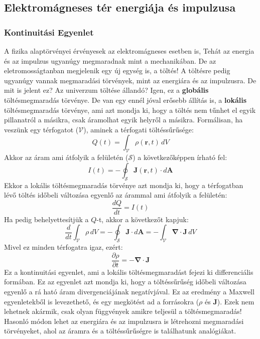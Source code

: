 \documentclass[../main.tex]{subfiles}
\begin{document}
\subsection{Elektromágneses tér energiája és impulzusa}
\subsubsection{Kontinuitási Egyenlet}
A fizika alaptörvényei érvényesek az elektromágneses esetben is, Tehát az energia és az impulzus ugyanúgy megmaradnak mint a mechanikában. De az eletromosságtanban megjelenik egy új egység is,
a töltés! A töltésre pedig ugyanúgy vannak megmaradási törvények, mint az energiára és az impulzusra. De mit is jelent ez? Az univerzum töltése állandó? Igen, ez a \textbf{globális} töltésmegmaradás törvénye.
De van egy ennél jóval erősebb állítás is, a \textbf{lokális} töltésmegmaradás törvénye, ami azt mondja ki, hogy a töltés nem tűnhet el egyik pillanatról a másikra, csak áramolhat egyik helyről a másikra.
Formálisan, ha veszünk egy térfogatot ($\mathcal{V}$), aminek a térfogati töltéssűrűsége:
\begin{equation}
    Q(t) = \int_{\mathcal{V}} \rho(\mathbf{r}, t) \, dV
\end{equation}
Akkor az áram ami átfolyik a felületén ($\mathcal{S}$) a következőképpen írható fel:
\begin{equation}
    I(t) = - \oint_{\mathcal{S}} \mathbf{J}(\mathbf{r}, t) \cdot d\mathbf{A}
\end{equation}
Ekkor a lokális töltésmegmaradás törvénye azt mondja ki, hogy a térfogatban lévő töltés időbeli változása egyenlő az árammal ami átfolyik a felületén:
\begin{equation}
    \frac{dQ}{dt} = I(t)
\end{equation}
Ha pedig behelyettesítjük a $Q$-t, akkor a következőt kapjuk:
\begin{equation}
    \frac{d}{dt} \int_{\mathcal{V}} \rho \, dV = - \oint_{\mathcal{S}} \mathbf{J} \cdot d\mathbf{A} = - \int_{\mathcal{V}} \boldsymbol{\nabla} \cdot \mathbf{J} \, dV
\end{equation}
Mivel ez minden térfogatra igaz, ezért:
\begin{equation}
    \boxed{\frac{\partial \rho}{\partial t} = -  \boldsymbol{\nabla} \cdot \mathbf{J}}
\end{equation}
Ez a kontinuitási egyenlet, ami a lokális töltésmegmaradást fejezi ki differenciális formában. Ez az egyenlet azt mondja ki, hogy a töltéssűrűség időbeli változása egyenlő a rá ható áram divergenciájának negatívjával.
Ez az eredmény a Maxwell egyenletekből is levezethető, és egy megkötést ad a forrásokra ($\rho$ és $\mathbf{J}$). Ezek nem lehetnek akármik, csak olyan függvények amikre teljesül a töltésmegmaradás!
Hasonló módon lehet az energiára és az impulzusra is létrehozni megmaradási törvényeket, ahol az áramra és a töltéssűrűségre is találhatunk analógiákat.
\end{document}
